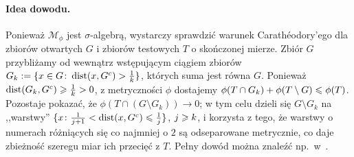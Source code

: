 \paragraph{Idea dowodu.}
Ponieważ $\mathcal{M}_\phi$ jest $\sigma$-algebrą, wystarczy sprawdzić warunek Carathéodory'ego dla zbiorów otwartych $G$ i zbiorów testowych $T$ o skończonej mierze. Zbiór $G$ przybliżamy od wewnątrz wstępującym ciągiem zbiorów $G_k := \{x \in G \colon \operatorname{dist}(x, G^c) > \frac{1}{k}\}$, których suma jest równa $G$. Ponieważ $\operatorname{dist}(G_k, G^c) \geqslant \frac{1}{k} > 0$, z metryczności $\phi$ dostajemy $\phi(T \cap G_k) + \phi(T \setminus G) \leqslant \phi(T)$. Pozostaje pokazać, że $\phi(T \cap (G \setminus G_k)) \to 0$; w tym celu dzieli się $G \setminus G_k$ na ,,warstwy'' $\{x \colon \frac{1}{j+1} < \operatorname{dist}(x, G^c) \leqslant \frac{1}{j}\}$, $j \geqslant k$, i korzysta z tego, że warstwy o numerach różniących się co najmniej o $2$ są odseparowane metrycznie, co daje zbieżność szeregu miar ich przecięć z $T$. Pełny dowód można znaleźć np.\ w~\cite{Plebanek}.

